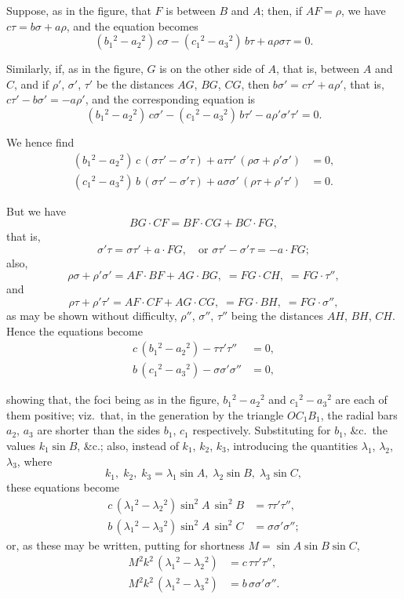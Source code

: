 \documentclass[11pt,a4paper]{book}
\begin{document}
Suppose, as in the figure, that $F$ is between $B$ and $A$; then, if $AF = \rho$, we have $c\tau = b\sigma + a\rho$, and the equation becomes
\[
(b_1{}^{\!2} - a_2{}^{\!2})\, c\sigma - (c_1{}^{\!2} - a_3{}^{\!2})\, b\tau + a\rho\sigma\tau = 0.
\]

Similarly, if, as in the figure, $G$ is on the other side of $A$, that is, between $A$ and $C$, and if $\rho'$, $\sigma'$, $\tau'$ be the distances $AG$, $BG$, $CG$, then $b\sigma' = c\tau' + a\rho'$, that is, $c\tau' - b\sigma' = -a\rho'$, and the corresponding equation is
\[
(b_1{}^{\!2} - a_2{}^{\!2})\, c\sigma' - (c_1{}^{\!2} - a_3{}^{\!2})\, b\tau' - a\rho'\sigma'\tau' = 0.
\]

We hence find
\begin{align*}
(b_1{}^{\!2} - a_2{}^{\!2})\, c\, (\sigma\tau' - \sigma'\tau) + a\tau\tau'\, (\rho\sigma + \rho'\sigma') &= 0, \\
(c_1{}^{\!2} - a_3{}^{\!2})\, b\, (\sigma\tau' - \sigma'\tau) + a\sigma\sigma'\, (\rho\tau + \rho'\tau') &= 0.
\end{align*}

But we have
\[
BG \cdot CF = BF \cdot CG + BC \cdot FG,
\]
that is,
\[
\sigma'\tau = \sigma\tau' + a \cdot FG, \quad \text{or } \sigma\tau' - \sigma'\tau = -a \cdot FG;
\]
also,
\[
\rho\sigma + \rho'\sigma' = AF \cdot BF + AG \cdot BG, \;= FG \cdot CH, \;= FG \cdot \tau'',
\]
and
\[
\rho\tau + \rho'\tau' = AF \cdot CF + AG \cdot CG, \;= FG \cdot BH, \;= FG \cdot \sigma'',
\]
as may be shown without difficulty, $\rho''$, $\sigma''$, $\tau''$ being the distances $AH$, $BH$, $CH$.
Hence the equations become
\begin{align*}
c\, (b_1{}^{\!2} - a_2{}^{\!2}) - \tau\tau'\tau'' &= 0, \\
b\, (c_1{}^{\!2} - a_3{}^{\!2}) - \sigma\sigma'\sigma'' &= 0,
\end{align*}

showing that, the foci being as in the figure, $b_1{}^{\!2} - a_2{}^{\!2}$ and $c_1{}^{\!2} - a_3{}^{\!2}$ are each of them positive; viz.\ that, in the generation by the triangle $OC_1B_1$, the radial bars $a_2$, $a_3$ are shorter than the sides $b_1$, $c_1$ respectively. Substituting for $b_1$, \&c.\ the values $k_1\sin B$, \&c.; also, instead of $k_1$, $k_2$, $k_3$, introducing the quantities $\lambda_1$, $\lambda_2$, $\lambda_3$, where
\[
k_1,\; k_2,\; k_3 = \lambda_1\sin A,\; \lambda_2\sin B,\; \lambda_3\sin C,
\]
these equations become
\begin{align*}
c\, (\lambda_1{}^{\!2} - \lambda_2{}^{\!2}) \sin^2 A \, \sin^2 B &= \tau\tau'\tau'', \\
b\, (\lambda_1{}^{\!2} - \lambda_3{}^{\!2}) \sin^2 A \, \sin^2 C &= \sigma\sigma'\sigma'';
\end{align*}
or, as these may be written, putting for shortness $M = \sin A \sin B \sin C$,
\begin{align*}
M^2 k^2\, (\lambda_1{}^{\!2} - \lambda_2{}^{\!2}) &= c\, \tau\tau'\tau'', \\
M^2 k^2\, (\lambda_1{}^{\!2} - \lambda_3{}^{\!2}) &= b\, \sigma\sigma'\sigma''.
\end{align*}
\end{document}

